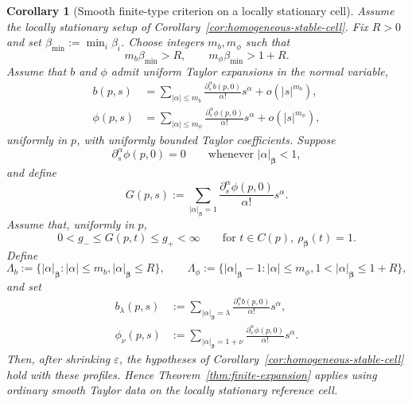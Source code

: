 \documentclass[11pt]{amsart}
\numberwithin{equation}{section}
\newtheorem{corollary}[theorem]{Corollary}
\theoremstyle{definition}
\theoremstyle{remark}
\newcommand{\eps}{\varepsilon}
\begin{document}
\begin{corollary}[Smooth finite-type criterion on a locally stationary cell]
\label{cor:smooth-finite-type}
Assume the locally stationary setup of
Corollary~\ref{cor:homogeneous-stable-cell}.  Fix $R>0$ and set
$\beta_{\min}:=\min_i\beta_i$.  Choose integers $m_b,m_\phi$ such that
\begin{equation}\label{eq:smooth-orders}
 m_b\beta_{\min}>R,
 \qquad
 m_\phi\beta_{\min}>1+R.
\end{equation}
Assume that $b$ and $\phi$ admit uniform Taylor expansions in the normal
variable,
\begin{align}
 b(p,s)&=\sum_{|\alpha|\le m_b}
 \frac{\partial_s^\alpha b(p,0)}{\alpha!}s^\alpha
 +o(|s|^{m_b}),\label{eq:b-uniform-taylor}\\
 \phi(p,s)&=\sum_{|\alpha|\le m_\phi}
 \frac{\partial_s^\alpha\phi(p,0)}{\alpha!}s^\alpha
 +o(|s|^{m_\phi}),\label{eq:phi-uniform-taylor}
\end{align}
uniformly in $p$, with uniformly bounded Taylor coefficients.  Suppose
\begin{equation}\label{eq:subprincipal-vanishing}
 \partial_s^\alpha\phi(p,0)=0
 \qquad\text{whenever }|\alpha|_{\bm\beta}<1,
\end{equation}
and define
\begin{equation}\label{eq:smooth-principal-phase}
 G(p,s):=\sum_{|\alpha|_{\bm\beta}=1}
 \frac{\partial_s^\alpha\phi(p,0)}{\alpha!}s^\alpha.
\end{equation}
Assume that, uniformly in $p$,
\[
 0<g_-\le G(p,t)\le g_+<\infty
 \qquad\text{for }t\in C(p),\ \rho_{\bm\beta}(t)=1.
\]
Define
\[
 \Lambda_b:=\bigl\{|\alpha|_{\bm\beta}:|\alpha|\le m_b,
 |\alpha|_{\bm\beta}\le R\bigr\},
 \qquad
 \Lambda_\phi:=\bigl\{|\alpha|_{\bm\beta}-1:|\alpha|\le m_\phi,
 1<|\alpha|_{\bm\beta}\le1+R\bigr\},
\]
and set
\begin{align}
 b_\lambda(p,s)&:=
 \sum_{|\alpha|_{\bm\beta}=\lambda}
 \frac{\partial_s^\alpha b(p,0)}{\alpha!}s^\alpha,
 \label{eq:smooth-b-lambda}\\
 \phi_\nu(p,s)&:=
 \sum_{|\alpha|_{\bm\beta}=1+\nu}
 \frac{\partial_s^\alpha\phi(p,0)}{\alpha!}s^\alpha.
 \label{eq:smooth-phi-nu}
\end{align}
Then, after shrinking $\eps$, the hypotheses of
Corollary~\ref{cor:homogeneous-stable-cell} hold with these profiles.
Hence Theorem~\ref{thm:finite-expansion} applies using ordinary smooth
Taylor data on the locally stationary reference cell.
\end{corollary}
\end{document}
